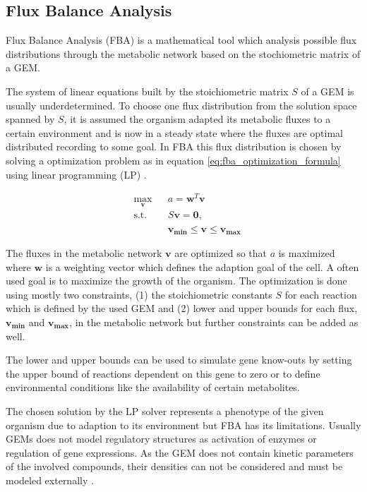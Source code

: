\subsection{Flux Balance Analysis}\label{ssec:flux_balance_analysis}

Flux Balance Analysis (FBA) is a mathematical tool which analysis possible flux
distributions through the metabolic network based on the stochiometric matrix of 
a GEM.

The system of linear equations built by the stoichiometric matrix $S$ of a GEM is
usually underdetermined. To choose one flux distribution from the solution space
spanned by $S$, it is assumed the organism adapted its metabolic fluxes to a certain
environment and is now in a steady state where the fluxes are optimal distributed
recording to some goal. In FBA this flux distribution is chosen by solving a
optimization problem as in equation \ref{eq:fba_optimization_formula} using linear
programming (LP) \cite{orth_what_2010}.

\begin{equation}\label{eq:fba_optimization_formula}
\begin{aligned}
& \underset{\bm{v}}{\text{max}}
& & a = \bm{w}^T \bm{v} \\
& \text{s.t.}
& & S\bm{v} = \bm{0}, \\
&&& \bm{v_{min}} \leq \bm{v} \leq \bm{v_{max}}
\end{aligned}
\end{equation}

The fluxes in the metabolic network $\bm{v}$ are optimized so that $a$ is maximized
where $\bm{w}$ is a weighting vector which defines the adaption goal of the cell.
A often used goal is to maximize the growth of the organism.
The optimization is done using mostly two constraints, (1) the stoichiometric constants $S$
for each reaction which is defined by the used GEM and (2) lower and upper bounds for 
each flux, $\bm{v_{min}}$ and $\bm{v_{max}}$, in the metabolic network but further 
constraints can be added as well.

The lower and upper bounds can be used to simulate gene know-outs by setting the upper
bound of reactions dependent on this gene to zero or to define environmental conditions
like the availability of certain metabolites.

The chosen solution by the LP solver represents a phenotype of the given organism
due to adaption to its environment but FBA has its limitations. Usually GEMs does
not model regulatory structures as activation of enzymes or regulation of gene
expressions. As the GEM does not contain kinetic parameters of the involved compounds, 
their densities can not be considered and must be modeled externally \cite{orth_what_2010}.


